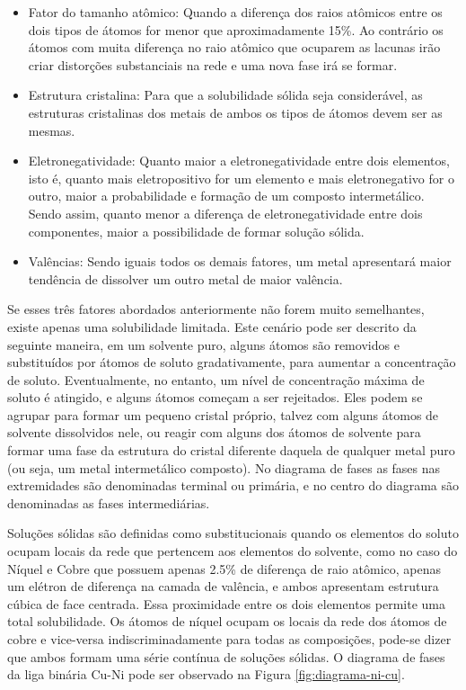 \begin{itemize}
   \item Fator do tamanho atômico: Quando a diferença dos raios atômicos entre os dois tipos de átomos for menor que aproximadamente 15\%. Ao contrário os átomos com muita diferença no raio atômico que ocuparem as lacunas irão criar distorções substanciais na rede e uma nova fase irá se formar.
    \item Estrutura cristalina: Para que a solubilidade sólida seja considerável, as estruturas cristalinas dos metais de ambos os tipos de átomos devem ser as mesmas.
    \item Eletronegatividade: Quanto maior a eletronegatividade entre dois elementos, isto é, quanto mais eletropositivo for um elemento e mais eletronegativo for o outro, maior a probabilidade e formação de um composto intermetálico. Sendo assim, quanto menor a diferença de eletronegatividade entre dois componentes, maior a possibilidade de formar solução sólida.
    \item Valências: Sendo iguais todos os demais fatores, um metal apresentará maior tendência de dissolver um outro metal de maior valência.
\end{itemize}

Se esses três fatores abordados anteriormente não forem muito semelhantes, existe apenas uma solubilidade limitada. Este cenário pode ser descrito da seguinte maneira, em um solvente puro, alguns átomos são removidos e substituídos por átomos de soluto gradativamente, para aumentar a concentração de soluto. Eventualmente, no entanto, um nível de concentração máxima de soluto é atingido, e alguns átomos começam a ser rejeitados. Eles podem se agrupar para formar um pequeno cristal próprio, talvez com alguns átomos de solvente dissolvidos nele, ou reagir com alguns dos átomos de solvente para formar uma fase da estrutura do cristal diferente daquela de qualquer metal puro (ou seja, um metal intermetálico composto). No diagrama de fases as fases nas extremidades são denominadas terminal ou primária, e no centro do diagrama são denominadas as fases intermediárias. 

Soluções sólidas são definidas como substitucionais quando os elementos do soluto ocupam locais da rede que pertencem aos elementos do solvente, como no caso  do Níquel e Cobre que possuem apenas 2.5\% de diferença de raio atômico, apenas um elétron de diferença na camada de valência, e ambos apresentam estrutura cúbica de face centrada. Essa proximidade entre os dois elementos permite uma total solubilidade. Os átomos de níquel ocupam os locais da rede dos átomos de cobre e vice-versa indiscriminadamente para todas as composições, pode-se dizer que ambos formam uma série contínua de soluções sólidas. O diagrama de fases da liga binária Cu-Ni pode ser observado na Figura \ref{fig:diagrama-ni-cu}.

